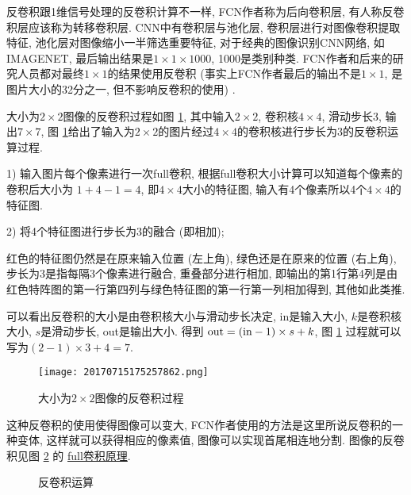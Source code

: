 反卷积跟1维信号处理的反卷积计算不一样, FCN作者称为后向卷积层, 有人称反卷积层应该称为转移卷积层.
CNN中有卷积层与池化层, 卷积层进行对图像卷积提取特征, 池化层对图像缩小一半筛选重要特征, 对于经典的图像识别CNN网络, 如IMAGENET, 最后输出结果是$1\times 1\times 1000$, 1000是类别种类.
FCN作者和后来的研究人员都对最终$1\times 1$的结果使用反卷积 (事实上FCN作者最后的输出不是$1\times 1$, 是图片大小的32分之一, 但不影响反卷积的使用) .
\begin{example}
大小为$2\times 2$图像的反卷积过程如图 \ref{20170715175257862}, 其中输入$2\times 2$, 卷积核$4\times 4$, 滑动步长3, 输出$7\times 7$, 图 \ref{20170715175257862}给出了输入为$2\times 2$的图片经过$4\times 4$的卷积核进行步长为3的反卷积运算过程.

1) 输入图片每个像素进行一次full卷积, 根据full卷积大小计算可以知道每个像素的卷积后大小为 $1+4-1=4$, 即$4\times 4$大小的特征图, 输入有4个像素所以4个$4\times 4$的特征图.

2) 将4个特征图进行步长为3的融合 (即相加);

\begin{remark}
    红色的特征图仍然是在原来输入位置 (左上角), 绿色还是在原来的位置 (右上角), 步长为3是指每隔3个像素进行融合, 重叠部分进行相加, 即输出的第1行第4列是由红色特阵图的第一行第四列与绿色特征图的第一行第一列相加得到, 其他如此类推.
\end{remark}

可以看出反卷积的大小是由卷积核大小与滑动步长决定, in是输入大小, $k$是卷积核大小, $s$是滑动步长, out是输出大小.
得到 $\textup{out} = (\textup{in} - 1) \times  s + k$, 图 \ref{20170715175257862} 过程就可以写为$ (2 - 1)\times 3 + 4 = 7$.
\begin{figure}[H]
    \centering
    \texttt{[image: 20170715175257862.png]}
    \caption{大小为$2\times 2$图像的反卷积过程}
    \label{20170715175257862}
\end{figure}
\vspace{-0.4cm}
\end{example}
这种反卷积的使用使得图像可以变大, FCN作者使用的方法是这里所说反卷积的一种变体, 这样就可以获得相应的像素值, 图像可以实现首尾相连地分割.
图像的反卷积见图 \ref{Dconop0203} 的 \href{https://github.com/vdumoulin/conv_arithmetic}{full卷积原理}.
\begin{figure}[H]
\centering
{}
\caption{反卷积运算}
\label{Dconop0203}
\end{figure}
